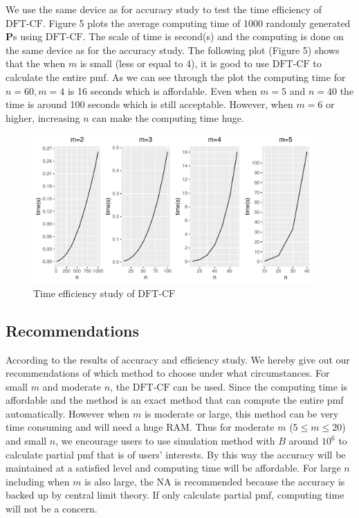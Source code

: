 \documentclass[12pt]{article}
\newcommand{\Pmat}{\mathbf{P}}
\newcommand{\NA}{{\textrm{NA}}}
\newcommand{\dft}{{\textrm{DFT-CF}}}
\begin{document}
We use the same device as for accuracy study to test the time efficiency of $\dft$. Figure 5 plots the average computing time of 1000 randomly generated $\Pmat$s using $\dft$. The scale of time is second(s) and the computing is done on the same device as for the accuracy study. The following plot (Figure 5) shows that the when $m$ is small (less or equal to 4), it is good to use $\dft$ to calculate the entire pmf. As we can see through the plot the computing time for $n=60, m=4$ is 16 seconds which is affordable. Even when $m=5$ and $n=40$ the time is around 100 seconds which is still acceptable. However, when $m=6$ or higher, increasing $n$ can make the computing time huge.
\begin{figure}%
	\centering
	\includegraphics[width=0.95\textwidth]{figures/effi.pdf}
	\caption{Time efficiency study of $\dft$}
	\label{fig: dft efficiency}
\end{figure}


\subsection{Recommendations}
According to the results of accuracy and efficiency study. We hereby give out our recommendations of which method to choose under what circumstances. For small $m$ and moderate $n$, the $\dft$ can be used. Since the computing time is affordable and the method is an exact method that can compute the entire pmf automatically. However when $m$ is moderate or large, this method can be very time consuming and will need a huge RAM. Thus for moderate $m$ ($5 \leq m \leq 20$) and small $n$, we encourage users to use simulation method with $B$ around $10^6$ to calculate partial pmf that is of users' interests. By this way the accuracy will be maintained at a satisfied level and computing time will be affordable. For large $n$ including when $m$ is also large, the $\NA$ is recommended because the accuracy is backed up by central limit theory. If only calculate partial pmf, computing time will not be a concern.
\end{document}
